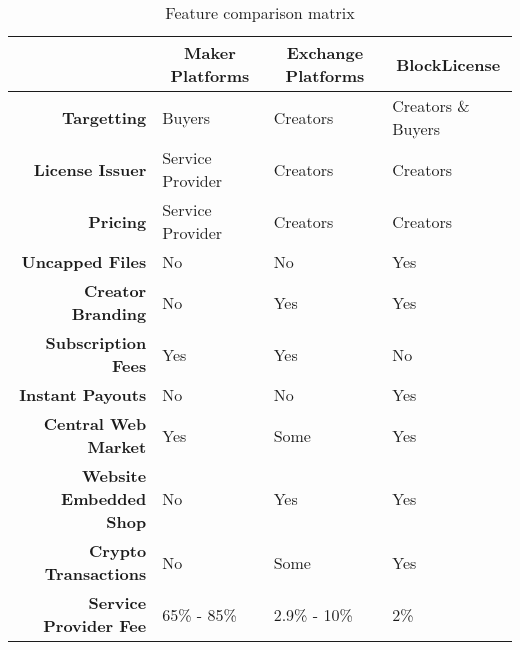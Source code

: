 \begin{table}[!htbp]
\centering
\begin{tabular}{@{}rlll@{}}
\toprule
\multicolumn{1}{l}{}         & \multicolumn{1}{c}{\textbf{Maker Platforms}} & \multicolumn{1}{c}{\textbf{Exchange Platforms}} & \multicolumn{1}{c}{\textbf{BlockLicense}} \\ \midrule
\textbf{Targetting}          & Buyers                                       & Creators                                        & Creators \& Buyers                        \\
\textbf{License Issuer}      & Service Provider                             & Creators                                        & Creators                                  \\
\textbf{Pricing}             & Service Provider                             & Creators                                        & Creators                                  \\
\textbf{Uncapped Files}      & No                                           & No                                              & Yes                                       \\
\textbf{Creator Branding}    & No                                           & Yes                                             & Yes                                       \\
\textbf{Subscription Fees}   & Yes                                          & Yes                                             & No                                        \\
\textbf{Instant Payouts}     & No                                           & No                                              & Yes                                       \\
\textbf{Central Web Market}  & Yes                                          & Some                                              & Yes                                       \\
\textbf{Website Embedded Shop}	& No                                           & Yes                                             & Yes                                       \\
\textbf{Crypto Transactions} & No                                           & Some                                              & Yes                                       \\
\textbf{Service Provider Fee}          & 65\% - 85\%                                  & 2.9\% - 10\%                                    & 2\%                                       \\ \bottomrule
\end{tabular}
\caption{Feature comparison matrix}
\label{comp-matrix}
\end{table}


